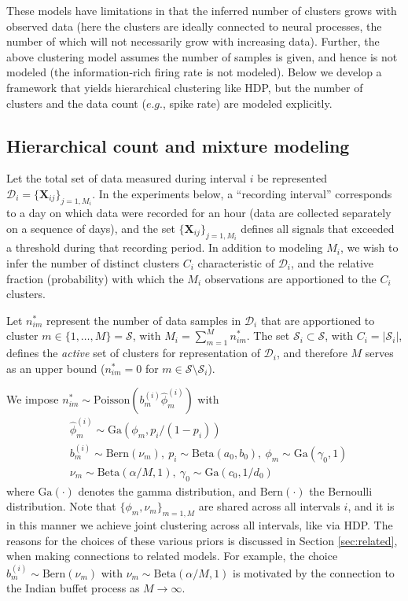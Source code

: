 \documentclass[journal]{IEEEtran}
\def\bf{\mathbf}
\newcommand{\beqs}{\begin{eqnarray}}
\newcommand{\eeqs}{\end{eqnarray}}
\newcommand{\Xmat}{{\bf X}}
\begin{document}
These models have limitations in that the inferred number of clusters grows with observed data (here the clusters are ideally connected to neural processes, the number of which will not necessarily grow with increasing data). Further, the above clustering model assumes the number of samples is given, and hence is not modeled (the information-rich firing rate is not modeled).
Below we develop a framework that yields hierarchical clustering like HDP, but the number of clusters and the data count ($e.g.$, spike rate) are modeled explicitly.

\subsection{Hierarchical count and mixture modeling\label{sec:focused}}

Let the total set of data measured during interval $i$ be represented $\bm{\mathcal{D}}_i=\{\Xmat_{ij}\}_{j=1,M_i}$. In the experiments below, a ``recording interval'' corresponds to a day on which data were recorded for an hour (data are collected separately on a sequence of days), and the set $\{\Xmat_{ij}\}_{j=1,M_i}$ defines all signals that exceeded a threshold during that recording period. In addition to modeling $M_i$, we wish to infer the number of distinct clusters $C_i$ characteristic of $\bm{\mathcal{D}}_i$, and the relative fraction (probability) with which the $M_i$ observations are apportioned to the $C_i$ clusters.

Let $n_{im}^*$ represent the number of data samples in $\bm{\mathcal{D}}_i$ that are apportioned to cluster $m\in\{1,\dots,M\}=\mathcal{S}$, with $M_i=\sum_{m=1}^M n_{im}^*$. The set $\mathcal{S}_i\subset \mathcal{S}$, with $C_i=|\mathcal{S}_i|$, defines the \emph{active} set of clusters for representation of $\bm{\mathcal{D}}_i$, and therefore $M$ serves as an upper bound ($n_{im}^*=0$ for $m\in\mathcal{S}\setminus\mathcal{S}_i$).

We impose $n_{im}^*\sim\mbox{Poisson}(b_m^{(i)}\hat{\phi}_m^{(i)})$ with
\beqs & \hat{\phi}_m^{(i)}\sim \mbox{Ga}(\phi_m,p_i/(1-p_i))\label{eq:gen1}\\& b_m^{(i)}\sim\mbox{Bern}(\nu_m),~p_i\sim\mbox{Beta}(a_0,b_0),~ \phi_m\sim\mbox{Ga}(\gamma_0,1)\\&\nu_m\sim\mbox{Beta}(\alpha/M,1),~\gamma_0\sim\mbox{Ga}(c_0,1/d_0)\label{eq:gen2}\eeqs
where $\mbox{Ga}(\cdot)$ denotes the gamma distribution, and $\mbox{Bern}(\cdot)$ the Bernoulli distribution. Note that $\{\phi_m,\nu_m\}_{m=1,M}$ are shared across all intervals $i$, and it is in this manner we achieve joint clustering across all intervals, like via HDP. The reasons for the choices of these various priors is discussed in Section \ref{sec:related}, when making connections to related models. For example, the choice $b_m^{(i)}\sim\mbox{Bern}(\nu_m)$ with $\nu_m\sim\mbox{Beta}(\alpha/M,1)$ is motivated by the connection to the Indian buffet process \cite{IBP} as $M\rightarrow\infty$.
\end{document}
